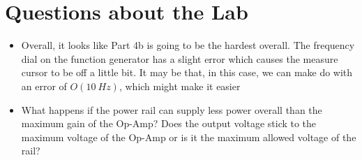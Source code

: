 \documentclass[english]{article}
\begin{document}
\section{Questions about the Lab}
\begin{itemize}
	\item Overall, it looks like Part 4b is going to be the hardest overall.
		The frequency dial on the function generator has a slight error which
		causes the measure cursor to be off a little bit. It may be that, in this
		case, we can make do with an error of $O(10\ Hz)$, which might make it
		easier
	\item What happens if the power rail can supply less power overall than the
		maximum gain of the Op-Amp? Does the output voltage stick to the maximum
		voltage of the Op-Amp or is it the maximum allowed voltage of the rail?
\end{itemize}
\end{document}
